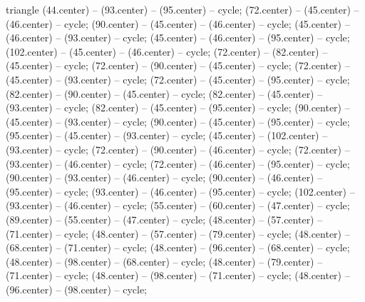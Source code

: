\begin{pgfonlayer}{triangle}
 (44.center) -- (93.center) -- (95.center) -- cycle; 
 (72.center) -- (45.center) -- (46.center) -- cycle; 
 (90.center) -- (45.center) -- (46.center) -- cycle; 
 (45.center) -- (46.center) -- (93.center) -- cycle; 
 (45.center) -- (46.center) -- (95.center) -- cycle; 
 (102.center) -- (45.center) -- (46.center) -- cycle; 
 (72.center) -- (82.center) -- (45.center) -- cycle; 
 (72.center) -- (90.center) -- (45.center) -- cycle; 
 (72.center) -- (45.center) -- (93.center) -- cycle; 
 (72.center) -- (45.center) -- (95.center) -- cycle; 
 (82.center) -- (90.center) -- (45.center) -- cycle; 
 (82.center) -- (45.center) -- (93.center) -- cycle; 
 (82.center) -- (45.center) -- (95.center) -- cycle; 
 (90.center) -- (45.center) -- (93.center) -- cycle; 
 (90.center) -- (45.center) -- (95.center) -- cycle; 
 (95.center) -- (45.center) -- (93.center) -- cycle; 
 (45.center) -- (102.center) -- (93.center) -- cycle; 
 (72.center) -- (90.center) -- (46.center) -- cycle; 
 (72.center) -- (93.center) -- (46.center) -- cycle; 
 (72.center) -- (46.center) -- (95.center) -- cycle; 
 (90.center) -- (93.center) -- (46.center) -- cycle; 
 (90.center) -- (46.center) -- (95.center) -- cycle; 
 (93.center) -- (46.center) -- (95.center) -- cycle; 
 (102.center) -- (93.center) -- (46.center) -- cycle; 
 (55.center) -- (60.center) -- (47.center) -- cycle; 
 (89.center) -- (55.center) -- (47.center) -- cycle; 
 (48.center) -- (57.center) -- (71.center) -- cycle; 
 (48.center) -- (57.center) -- (79.center) -- cycle; 
 (48.center) -- (68.center) -- (71.center) -- cycle; 
 (48.center) -- (96.center) -- (68.center) -- cycle; 
 (48.center) -- (98.center) -- (68.center) -- cycle; 
 (48.center) -- (79.center) -- (71.center) -- cycle; 
 (48.center) -- (98.center) -- (71.center) -- cycle; 
 (48.center) -- (96.center) -- (98.center) -- cycle; 

\end{pgfonlayer}
